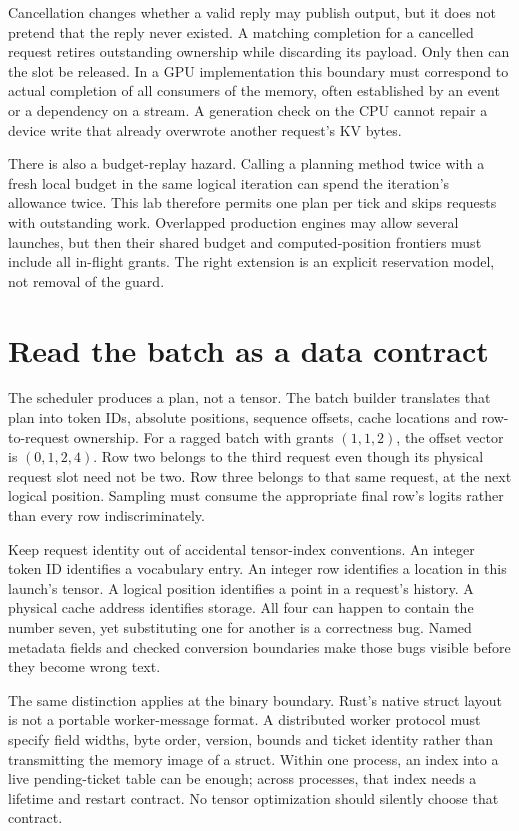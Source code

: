 Cancellation changes whether a valid reply may publish output, but it
does not pretend that the reply never existed. A matching completion for
a cancelled request retires outstanding ownership while discarding its
payload. Only then can the slot be released. In a GPU implementation
this boundary must correspond to actual completion of all consumers of
the memory, often established by an event or a dependency on a stream.
A generation check on the CPU cannot repair a device write that already
overwrote another request's KV bytes.

There is also a budget-replay hazard. Calling a planning method twice
with a fresh local budget in the same logical iteration can spend the
iteration's allowance twice. This lab therefore permits one plan per
tick and skips requests with outstanding work. Overlapped production
engines may allow several launches, but then their shared budget and
computed-position frontiers must include all in-flight grants. The right
extension is an explicit reservation model, not removal of the guard.

\section{Read the batch as a data contract}

The scheduler produces a plan, not a tensor. The batch builder translates
that plan into token IDs, absolute positions, sequence offsets, cache
locations and row-to-request ownership. For a ragged batch with grants
$(1,1,2)$, the offset vector is $(0,1,2,4)$. Row two belongs to the third
request even though its physical request slot need not be two. Row three
belongs to that same request, at the next logical position. Sampling
must consume the appropriate final row's logits rather than every row
indiscriminately.

Keep request identity out of accidental tensor-index conventions.
An integer token ID identifies a vocabulary entry. An integer row
identifies a location in this launch's tensor. A logical position
identifies a point in a request's history. A physical cache address
identifies storage. All four can happen to contain the number seven,
yet substituting one for another is a correctness bug. Named metadata
fields and checked conversion boundaries make those bugs visible before
they become wrong text.

The same distinction applies at the binary boundary. Rust's native
struct layout is not a portable worker-message format. A distributed
worker protocol must specify field widths, byte order, version, bounds
and ticket identity rather than transmitting the memory image of a
struct. Within one process, an index into a live pending-ticket table
can be enough; across processes, that index needs a lifetime and restart
contract. No tensor optimization should silently choose that contract.

